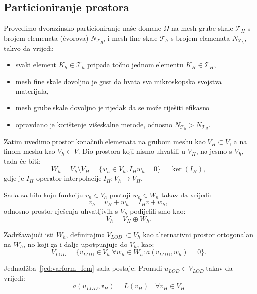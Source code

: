 \documentclass[zavrsnirad]{fer}
\begin{document}
\subsection{Particioniranje prostora}

Provedimo dvorazinsko particioniranje naše domene $\Omega$
na mesh grube skale $\mathcal{T}_H$ s brojem elemenata (čvorova) $N_{\mathcal{T}_H}$,
i mesh fine skale $\mathcal{T}_h$ s brojem elemenata $N_{\mathcal{T}_h}$, takvo da vrijedi:
\begin{itemize}
  \item svaki element $K_h \in \mathcal{T}_h$ pripada točno jednom elementu $K_H \in \mathcal{T}_H$,
  \item mesh fine skale dovoljno je gust da hvata sva mikroskopska svojstva materijala,
  \item mesh grube skale dovoljno je rijedak da se može riješiti efikasno
  \item opravdano je korištenje višeskalne metode, odnosno $N_{\mathcal{T}_h} > N_{\mathcal{T}_H}$.
\end{itemize}

Zatim uvedimo  prostor konačnih elemenata na grubom meshu kao $V_H \subset V$,
a na finom meshu kao $V_h \subset V$.
Dio prostora koji nismo uhvatili u $V_H$, no jesmo s $V_h$, tada će biti:
\begin{equation}
  \label{jed:vf}
  W_h = V_h \setminus V_H = \{w_h \in V_h, I_{H}w_h = 0\} = \ker(I_{H}),
\end{equation}
gdje je $I_{H}$ operator interpolacije $I_{H} : V_h \to V_H$.

Sada za bilo koju funkciju $v_h \in V_h$ postoji $w_h \in W_h$ takav da vrijedi:
\begin{equation}
  \label{jed:dekompozicija}
  v_h = v_H + w_h = I_{H}v + w_h,
\end{equation}
odnosno prostor rješenja uhvatljivih s $V_h$ podijelili smo kao:
\begin{equation}
  \label{jed:dekompozicija_prostora}
  V_h = V_H \oplus W_h.
\end{equation}

Zadržavajući isti $W_h$, definirajmo $V_{LOD}\ \subset V_h$ kao alternativni prostor ortogonalan na $W_h$,
no koji ga i dalje upotpunjuje do $V_h$, kao:
\begin{equation}
  \label{jed:vhms}
  V_{LOD} = \{v_{LOD} \in V_h \vert \forall w_h \in W_h : a(v_{LOD}, w_h) = 0\}.
\end{equation}

Jednadžba\ \ref{jed:varform_fem} sada postaje:
Pronađi $u_{LOD} \in V_{LOD}$ takav da vrijedi:
\begin{equation}
  \label{jed:varform_fem_ms}
  a(u_{LOD}, v_H) = L(v_H) \quad \forall v_H \in V_H
\end{equation}
\end{document}
